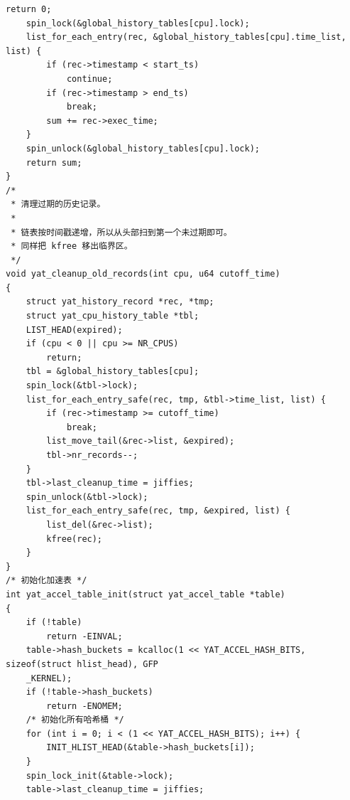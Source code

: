\documentclass[10pt,a4paper]{article}
\newenvironment{yatpage}{\vspace*{0pt}}{\par}
\begin{document}
\begin{yatpage}
\begin{Verbatim}[fontsize=\fontsize{8.2}{9.8}\selectfont]
        return 0;
    spin_lock(&global_history_tables[cpu].lock);
    list_for_each_entry(rec, &global_history_tables[cpu].time_list, list) {
        if (rec->timestamp < start_ts)
            continue;
        if (rec->timestamp > end_ts)
            break;
        sum += rec->exec_time;
    }
    spin_unlock(&global_history_tables[cpu].lock);
    return sum;
}
/*
 * 清理过期的历史记录。
 *
 * 链表按时间戳递增，所以从头部扫到第一个未过期即可。
 * 同样把 kfree 移出临界区。
 */
void yat_cleanup_old_records(int cpu, u64 cutoff_time)
{
    struct yat_history_record *rec, *tmp;
    struct yat_cpu_history_table *tbl;
    LIST_HEAD(expired);
    if (cpu < 0 || cpu >= NR_CPUS)
        return;
    tbl = &global_history_tables[cpu];
    spin_lock(&tbl->lock);
    list_for_each_entry_safe(rec, tmp, &tbl->time_list, list) {
        if (rec->timestamp >= cutoff_time)
            break;
        list_move_tail(&rec->list, &expired);
        tbl->nr_records--;
    }
    tbl->last_cleanup_time = jiffies;
    spin_unlock(&tbl->lock);
    list_for_each_entry_safe(rec, tmp, &expired, list) {
        list_del(&rec->list);
        kfree(rec);
    }
}
/* 初始化加速表 */
int yat_accel_table_init(struct yat_accel_table *table)
{
    if (!table)
        return -EINVAL;
    table->hash_buckets = kcalloc(1 << YAT_ACCEL_HASH_BITS, sizeof(struct hlist_head), GFP
    _KERNEL);
    if (!table->hash_buckets)
        return -ENOMEM;
    /* 初始化所有哈希桶 */
    for (int i = 0; i < (1 << YAT_ACCEL_HASH_BITS); i++) {
        INIT_HLIST_HEAD(&table->hash_buckets[i]);
    }
    spin_lock_init(&table->lock);
    table->last_cleanup_time = jiffies;
\end{Verbatim}
\end{yatpage}
\newpage
\end{document}
